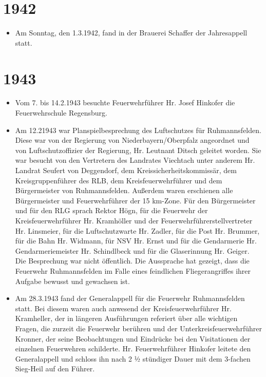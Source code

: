 \documentclass[12pt,a4paper]{book}
\begin{document}
\section*{1942}

\begin{itemize}
\item Am Sonntag, den 1.3.1942, fand in der Brauerei Schaffer der Jahresappell
statt.
\end{itemize}

\section*{1943}

\begin{itemize}
\item Vom 7. bis 14.2.1943 besuchte Feuerwehrführer Hr. Josef Hinkofer die
Feuerwehrschule Regensburg.

\item Am 12.21943 war Planspielbesprechung des Luftschutzes für Ruhmannsfelden.
Diese war von der Regierung von Niederbayern/Oberpfalz angeordnet und von
Luftschutzoffizier der Regierung, Hr. Leutnant Ditsch geleitet worden. Sie war
besucht von den Vertretern des Landrates Viechtach unter anderem Hr. Landrat
Seufert von Deggendorf, dem Kreissicherheitskommissär, dem Kreisgruppenführer
des RLB, dem Kreisfeuerwehrführer und dem Bürgermeister von Ruhmannsfelden.
Außerdem waren erschienen alle Bürgermeister und Feuerwehrführer der 15 km-Zone.
Für den Bürgermeister und für den RLG sprach Rektor Högn, für die Feuerwehr der
Kreisfeuerwehrführer Hr. Kramhöller und der Feuerwehrführerstellvertreter Hr.
Linsmeier, für die Luftschutzwarte Hr. Zadler, für die Post Hr. Brummer, für die
Bahn Hr. Widmann, für NSV Hr. Ernst und für die Gendarmerie Hr.
Gendarmeriemeister Hr. Schindlbeck und für die Glaserinnung Hr. Geiger. Die
Besprechung war nicht öffentlich. Die Aussprache hat gezeigt, dass die Feuerwehr
Ruhmannsfelden im Falle eines feindlichen Fliegerangriffes ihrer Aufgabe bewusst
und gewachsen ist.

\item Am 28.3.1943 fand der Generalappell für die Feuerwehr Ruhmannsfelden
statt. Bei diesem waren auch anwesend der Kreisfeuerwehrführer Hr. Kramheller,
der in längeren Ausführungen referiert über alle wichtigen Fragen, die zurzeit
die Feuerwehr berühren und der Unterkreisfeuerwehrführer Kronner, der seine
Beobachtungen und Eindrücke bei den Visitationen der einzelnen Feuerwehren
schilderte. Hr. Feuerwehrführer Hinkofer leitete den Generalappell und schloss
ihn nach 2 ½ stündiger Dauer mit dem 3-fachen Sieg-Heil auf den Führer.


\end{itemize}
\end{document}
